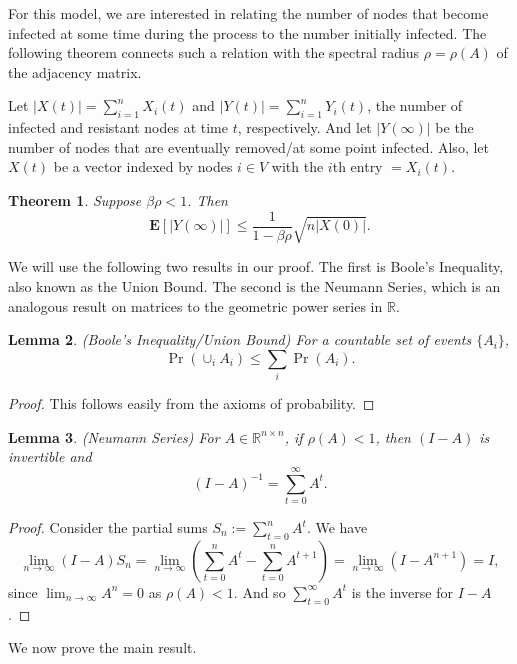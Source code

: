 \documentclass[11pt]{article}
\newtheorem{theorem}{Theorem}[section]
\newtheorem{lemma}[theorem]{Lemma}
\begin{document}
For this model, we are interested in relating the number of nodes that become infected at some time during the process to the number initially infected. The following theorem connects such a relation with the spectral radius $\rho=\rho(A)$ of the adjacency matrix.

Let $|X(t)| = \sum_{i=1}^n X_i(t)$ and $|Y(t)| = \sum_{i=1}^n Y_i(t)$, the number of infected and resistant nodes at time $t$, respectively. And let $|Y(\infty)|$ be the number of nodes that are eventually removed/at some point infected. Also, let $X(t)$ be a vector indexed by nodes $i\in V$ with the $i$th entry $=X_i(t)$.

\begin{theorem}
Suppose $\beta \rho < 1$. Then
$$\mathbf{E} [|Y(\infty)|] \leq \frac{1}{1-\beta \rho} \sqrt{n|X(0)|}.$$
\end{theorem}

We will use the following two results in our proof. The first is Boole's Inequality, also known as the Union Bound. The second is the Neumann Series, which is an analogous result on matrices to the geometric power series in $\mathbb{R}$.

\begin{lemma} (Boole's Inequality/Union Bound)
For a countable set of events $\{ A_i \}$,
$$\Pr(\cup_i A_i) \leq \sum_i \Pr(A_i).$$
\end{lemma}

\begin{proof}
This follows easily from the axioms of probability.
\end{proof}

\begin{lemma} (Neumann Series) For $A\in \mathbb{R}^{n\times n}$, if $\rho(A)<1$, then $(I-A)$ is invertible and
$$(I-A)^{-1} = \sum_{t=0}^{\infty} A^t.$$
\end{lemma}

\begin{proof}
Consider the partial sums $S_n := \sum_{t=0}^n A^t$. We have
$$\lim_{n\rightarrow \infty} (I-A) S_n = \lim_{n\rightarrow \infty} \left( \sum_{t=0}^n A^t - \sum_{t=0}^n A^{t+1} \right) = \lim_{n\rightarrow \infty} (I-A^{n+1}) = I,$$
since $\lim_{n\rightarrow \infty} A^n = 0$ as $\rho(A)<1$. And so $\sum_{t=0}^\infty A^t$ is the inverse for $I-A$.
\end{proof}

We now prove the main result.
\end{document}
